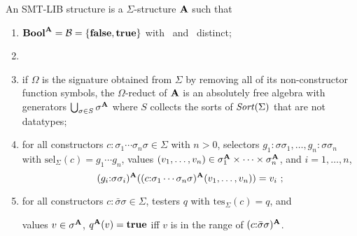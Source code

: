\begin{definition}
\label{def:structure}
An SMT-LIB structure is a $\Sigma$-structure $\mathbf{A}$ such that

\begin{enumerate}
\item $\textbf{Bool}^{\mathbf{A}} = \mathcal{B} = \{ \textbf{false}, \textbf{true} \}$ with \false\ and \true\ distinct;

\item {}


%

\item
if $\Omega$ is the signature obtained from $\Sigma$ by removing 
all of its non-constructor function symbols,
the $\Omega$-reduct of $\mathbf{A}$ is an absolutely free algebra with 
generators $\bigcup_{ \sigma \in S} \sigma^{\mathbf{A}}$
where $S$ collects the sorts of $\mathit{Sort}(\Sigma)$ that are not datatypes;

\item
for all constructors $c{:}\sigma_1\cdots\sigma_n\sigma \in \Sigma$ with $n>0$,
selectors $g_1{:}\sigma\sigma_1, \ldots, g_n{:}\sigma\sigma_n$ 
with $\mathrm{sel}_\Sigma(c) = g_1\cdots g_n$, 
values $(v_1, \ldots, v_n) \in \sigma_1^{\mathbf{A}} \times \cdots \times \sigma_n^{\mathbf{A}}$,
and
$i=1,\ldots,n$,
\[
 (g_i{:}\sigma\sigma_i)^{\str A}((c{:}\sigma_1\cdots\sigma_n\sigma)^{\str A}(v_1, \ldots, v_n)) = v_i\ ;
\]

\item
for all constructors $c{:}\bar{\sigma}\sigma \in \Sigma$,
testers $q$ with $\mathrm{tes}_\Sigma(c) = q$, and
\begin{center}
  values $v \in \sigma^{\mathbf{A}}$,
 $q^{\mathbf{A}}(v) = \textbf{true}$ iff $v$ is in the range of $(c{:}\bar{\sigma}\sigma)^{\mathbf{A}}$.
\end{center}
\end{enumerate}
\end{definition}


